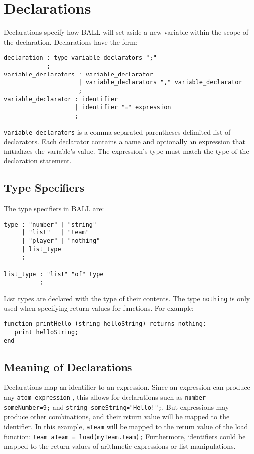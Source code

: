 \section{Declarations}\label{Declarations}
Declarations specify how BALL will set aside a new variable within the
scope of the declaration. Declarations have the form:

\begin{verbatim}
declaration : type variable_declarators ";"
            ;
variable_declarators : variable_declarator
                     | variable_declarators "," variable_declarator
                     ;
variable_declarator : identifier
                    | identifier "=" expression
                    ;
\end{verbatim}

\texttt{variable\_declarators} is a comma-separated parentheses
delimited list of declarators. Each declarator contains a name and
optionally an expression that initializes the variable's value. The
expression's type must match the type of the declaration statement.

\subsection{Type Specifiers}

The type specifiers in BALL are: 

\begin{verbatim}
type : "number" | "string"
     | "list"   | "team"
     | "player" | "nothing"
     | list_type
     ;

list_type : "list" "of" type
          ;
\end{verbatim}

List types are declared with the type of their contents.  The type
\texttt{nothing} is only used when specifying return values for
functions. For example:

\begin{verbatim}
function printHello (string helloString) returns nothing:
   print helloString;
end
\end{verbatim}

\subsection{Meaning of Declarations}

Declarations map an identifier to an expression. Since an expression
can produce any \texttt{atom\_expression} , this allows for
declarations such as \texttt{number someNumber=9;} and \texttt{string
  someString="Hello!";}. But expressions may produce other
combinations, and their return value will be mapped to the
identifier. In this example, \texttt{aTeam} will be mapped to the
return value of the load function: \texttt{team aTeam =
  load(myTeam.team);} Furthermore, identifiers could be mapped to the
return values of arithmetic expressions or list manipulations.

